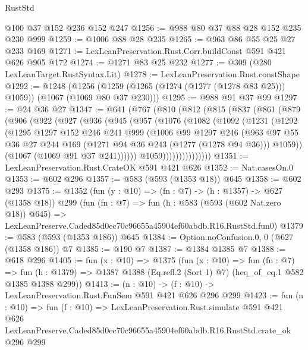 \begin{lexlean}{RustStd}
\begin{coremodule}
    @100
    @37
    @152
    @236
    @152
    @247
@1256 := @988 @80 @37 @88 @28 @152 @235 @230 @999
@1259 := @1006 @88 @28 @235
@1265 := @963 @86 @55 @25 @27 @233 @169
@1271 := LexLeanPreservation.Rust.Corr.buildConst @591 @421 @626 @905 @172
@1274 := @1271 @83 @25 @232
@1277 := @309 (@280 LexLeanTarget.RustSyntax.Lit)
@1278 := LexLeanPreservation.Rust.constShape
@1292 := @1248
    (@1256 (@1259 (@1265 (@1274 (@1277 (@1278 @83 @25))) @1059)) (@1067 (@1069 @80 @37 @230)))
@1295 := @988 @91 @37 @99
@1297 := @24 @36 @27
@1347 := @641
    (@767
      (@810
        (@812
          (@815
            (@837
              (@861
                (@879
                  (@906
                    (@922
                      (@927
                        (@936
                          (@945
                            (@957
                              (@1076
                                (@1082
                                  (@1092
                                    (@1231
                                      (@1292
                                        (@1295
                                          @1297
                                          @152
                                          @246
                                          @241
                                          @999
                                          (@1006
                                            @99
                                            @1297
                                            @246
                                            (@963
                                              @97
                                              @55
                                              @36
                                              @27
                                              @244
                                              @169
                                              (@1271 @94 @36 @243 (@1277 (@1278 @94 @36)))
                                              @1059))
                                          (@1067 (@1069 @91 @37 @241))))))
                                  @1059)))))))))))))))
@1351 := LexLeanPreservation.Rust.CrateOK @591 @421 @626
@1352 := Nat.casesOn.{0}
@1353 := @602 @296
@1357 := @583 (@593 (@1353 @18)) @645
@1358 := @602 @293
@1375 := @1352
    (fun (y : @10) => (fn : @7) -> (h : @1357) -> @627 (@1358 @18))
    @299
    (fun (fn : @7) =>
    fun (h : @583 (@593 (@602 Nat.zero @18)) @645) =>
    LexLeanPreserve.Caded85d0ec70c96655a45904ef60abdb.R16.RustStd.fun0)
@1379 := @583 (@593 (@1353 @186)) @645
@1384 := Option.noConfusion.{0, 0} (@627 (@1358 @186)) @7
@1385 := @190 @7
@1387 := @1384 @1385 @7
@1388 := @618 @296
@1405 := fun (x : @10) =>
  @1375
    (fun (x : @10) =>
    fun (fn : @7) =>
    fun (h : @1379) => @1387 @1388 (Eq.refl.{2} (Sort 1) @7) (heq_of_eq.{1} @582 @1385 @1388 @299))
@1413 := (n : @10) -> (f : @10) -> LexLeanPreservation.Rust.FunSem @591 @421 @626 @296 @299
@1423 := fun (n : @10) =>
  fun (f : @10) =>
  LexLeanPreservation.Rust.simulate
    @591
    @421
    @626
    LexLeanPreserve.Caded85d0ec70c96655a45904ef60abdb.R16.RustStd.crate_ok
    @296
    @299
\end{coremodule}
\end{lexlean}
